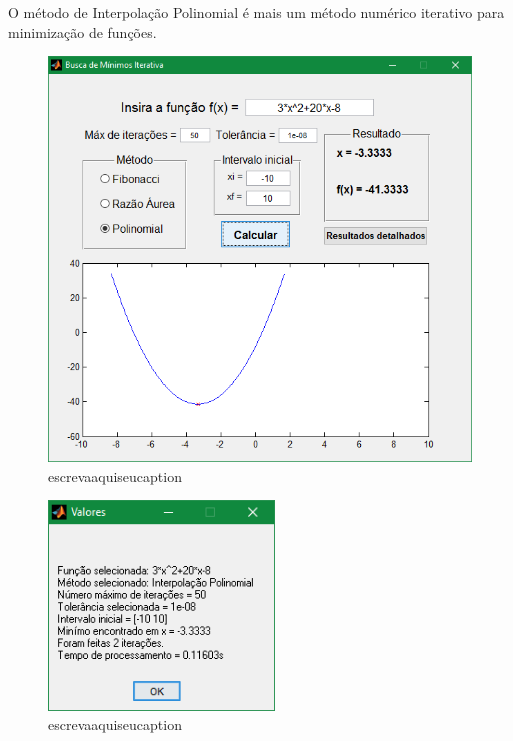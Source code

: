 O método de Interpolação Polinomial é mais um método numérico iterativo para minimização de funções. 

\begin{figure}[h]
	\begin{center}	
		\includegraphics[width=14cm]{../interpol/f1_gui.PNG}
		\caption{escrevaaquiseucaption}
		\label{fig:f1_gui}
	\end{center}
\end{figure}

\begin{figure}[H]
	\begin{center}	
		\includegraphics[width=6cm]{../interpol/f1_resultados.PNG}
		\caption{escrevaaquiseucaption}
		\label{fig:f1_resultados}
	\end{center}
\end{figure}

